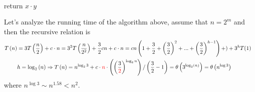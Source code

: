 \begin{algorithm}
\SetAlgoLined
{}
 \ \\ 
    { return \(x \cdot y\) } 
 \ \\ 
 
\end{algorithm}
Let's analyze the running time of the algorithm above, assume that \(n = 2^{m}\) and then the recursive relation is 
\begin{equation*}
    \begin{split}
        T\left(n\right) & = 3T\left(\frac{n}{2}\right) + c\cdot n = 3^2 T\left(\frac{n}{2^2}\right) + \frac{3}{2}cn + c\cdot n = cn\left(1 + \frac{3}{2} + \left(\frac{3}{2}\right)^2 + ...  + \left(\frac{3}{2}\right)^{h-1} \right) + ) + 3^{h}T(1) \\
        & h = \log_{2}\left(n\right) \Rightarrow T\left(n\right) = n^{\log_{2}{3}} +  c\cdot \textcolor{red}{n}\cdot \left(\left(\frac{3}{\textcolor{red}{2}}\right)^{\log_{2}{n}}\right) / \left(\frac{3}{2} - 1\right) = \theta \left( 3^{\log_{2}(n)} \right) =  \theta \left( n^{\log 3} \right)  
    \end{split}
\end{equation*}
where \(n^{\log 3}  \sim n^{1.58} < n^2 \).

\fi




